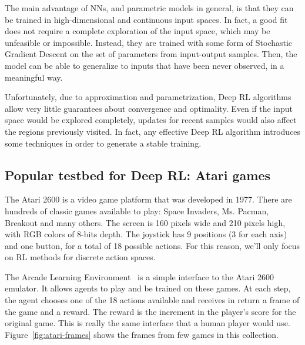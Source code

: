 The main advantage of NNs, and parametric models in general, is that they can
be trained in high-dimensional and continuous input spaces. In fact, a good
fit does not require a complete exploration of the input space, which may be
unfeasible or impossible. Instead, they are trained with some form of
Stochastic Gradient Descent on the set of parameters from input-output
samples. Then, the model can be able to generalize to inputs that have been
never observed, in a meaningful way.

Unfortunately, due to approximation and parametrization, Deep RL algorithms
allow very little guarantees about convergence and optimality. Even if the
input space would be explored completely, updates for recent samples would
also affect the regions previously visited. In fact, any effective Deep RL
algorithm introduces some techniques in order to generate a stable training.


\subsection{Popular testbed for Deep RL: Atari games}

\label{sec:atari-envs}

The Atari 2600 is a video game platform that was developed in 1977. There are
hundreds of classic games available to play: Space Invaders, Ms. Pacman,
Breakout and many others. The screen is 160 pixels wide and 210 pixels high,
with RGB colors of 8-bits depth. The joystick has 9 positions (3 for each
axis) and one button, for a total of 18 possible actions. For this reason,
we'll only focus on RL methods for discrete action spaces.

The Arcade Learning Environment~\cite{bib:atari-games} is a simple interface
to the Atari 2600 emulator. It allows agents to play and be trained on these
games. At each step, the agent chooses one of the 18 actions available and
receives in return a frame of the game and a reward. The reward is the
increment in the player's score for the original game. This is really the same
interface that a human player would use. Figure~\ref{fig:atari-frames} shows
the frames from few games in this collection. 

